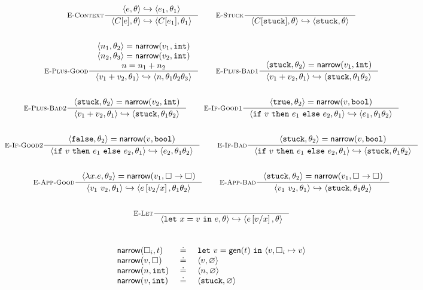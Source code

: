\begin{figure*}
\begin{gather*}
\inference[\recontext]
  {\step{e}{\su}{e_1}{\su_1}}
  {\step{C[e]}{\su}{C[e_1]}{\su_1}}
\qquad
\inference[\restuck]
  {}
  {\step{C[\stuck]}{\su}{\stuck}{\su}}
\\ \\
\inference[\replusgood]
  {\pair{n_1}{\su_2} = \force{v_1}{\tint} \\
   \pair{n_2}{\su_3} = \force{v_2}{\tint} \\ 
   n = \eplus{n_1}{n_2}}
  {\step{\eplus{v_1}{v_2}}{\su_1}{n}{\su_1\su_2\su_3}}
\qquad
\inference[\replusbadone]
  {\pair{\stuck}{\su_2} = \force{v_1}{\tint}}
  {\step{\eplus{v_1}{v_2}}{\su_1}{\stuck}{\su_1\su_2}}
\\ \\
\inference[\replusbadtwo]
  {\pair{\stuck}{\su_2} = \force{v_2}{\tint}}
  {\step{\eplus{v_1}{v_2}}{\su_1}{\stuck}{\su_1\su_2}}
\qquad
\inference[\reifgoodone]
  {\pair{\etrue}{\su_2} = \force{v}{\tbool}}
  {\step{\eif{v}{e_1}{e_2}}{\su_1}{e_1}{\su_1\su_2}}
\\ \\
\inference[\reifgoodtwo]
  {\pair{\efalse}{\su_2} = \force{v}{\tbool}}
  {\step{\eif{v}{e_1}{e_2}}{\su_1}{e_2}{\su_1\su_2}}
\qquad
\inference[\reifbad]
  {\pair{\stuck}{\su_2} = \force{v}{\tbool}}
  {\step{\eif{v}{e_1}{e_2}}{\su_1}{\stuck}{\su_1\su_2}}
\\ \\
\inference[\reappgood]
  {\pair{\efun{x}{e}}{\su_2} = \force{v_1}{\tfun{\thole{}}{\thole{}}}}
  {\step{\eapp{v_1}{v_2}}{\su_1}{e\sub{x}{v_2}}{\su_1\su_2}}
\qquad
\inference[\reappbad]
  {\pair{\stuck}{\su_2} = \force{v_1}{\tfun{\thole{}}{\thole{}}}}
  {\step{\eapp{v_1}{v_2}}{\su_1}{\stuck}{\su_1\su_2}}
\\ \\
\inference[\relet]
  {}
  {\step{\elet{x}{v}{e}}{\su}{e\sub{x}{v}}{\su}}
\end{gather*}
\\ %
\[
\begin{array}{lcl}
\mathsf{narrow}(\square_{i}, t) & \ \doteq\  & \mathtt{let}\ v = \mathsf{gen}(t)\ \mathtt{in}\ \langle v, \square_{i} \mapsto v \rangle \\
\mathsf{narrow}(v, \square_{})  & \ \doteq\  & \langle v, \varnothing \rangle \\
\mathsf{narrow}(n, \mathtt{int})    & \ \doteq\  & \langle n, \varnothing \rangle \\
\mathsf{narrow}(v, \mathtt{int})    & \ \doteq\  & \langle \mathtt{stuck}, \varnothing \rangle \\

\end{array}\]
\end{figure*}
